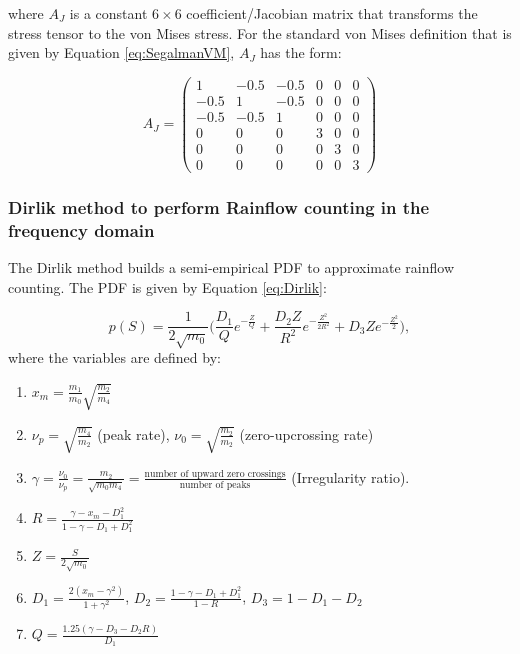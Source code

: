 \documentclass[a4paper,twoside]{bth}
\begin{document}
where $A_J$ is a constant $6 \times 6$ coefficient/Jacobian matrix that transforms the stress tensor to the von Mises stress. For the standard von Mises definition that is given by Equation \ref{eq:SegalmanVM}, $A_J$ has the form:

\begin{equation}
A_J =
\begin{pmatrix}
1 & -0.5 & -0.5 & 0 & 0 & 0 \\
-0.5 & 1 & -0.5 & 0 & 0 & 0 \\
-0.5 & -0.5 & 1 & 0 & 0 & 0 \\
0 & 0 & 0 & 3 & 0 & 0 \\
0 & 0 & 0 & 0 & 3 & 0 \\
0 & 0 & 0 & 0 & 0 & 3
\end{pmatrix}
\end{equation}

\subsubsection{Dirlik method to perform Rainflow counting in the frequency domain}
The Dirlik method builds a semi-empirical \ac{PDF} to approximate rainflow counting. The \ac{PDF} is given by Equation \ref{eq:Dirlik}:

\begin{equation} \label{eq:Dirlik}
    p(S) = \frac{1}{2\sqrt{m_0}} \big( \frac{D_1}{Q}e^{-\frac{Z}{Q}} + \frac{D_2Z}{R^2}e^{-\frac{Z^2}{2R^2}}+D_3Ze^{-\frac{Z^2}{2}} \big),
\end{equation}
where the variables are defined by:
\begin{enumerate} %
    \item $x_m = \frac{m_1}{m_0} \sqrt{\frac{m_2}{m_4}}$
    \item $\nu_p = \sqrt{\frac{m_4}{m_2}}$ (peak rate), $\nu_0 = \sqrt{\tfrac{m_2}{m_2}}$ (zero-upcrossing rate)
    \item $\gamma = \frac{\nu_0}{\nu_p} = \frac{m_2}{\sqrt{m_0m_4}} = \frac{\text{number of upward zero crossings}}{\text{number of peaks}}$ (Irregularity ratio).
    \item $R=\frac{\gamma-x_m-D_1^2}{1-\gamma-D_1+D_1^2}$
    \item $Z = \frac{S}{2\sqrt{m_0}}$
    \item $D_1 = \frac{2(x_m-\gamma^2)}{1+\gamma^2}$, \quad $D_2 = \frac{1-\gamma - D_1+D_1^2}{1-R}$, \quad $D_3 = 1-D_1-D_2$
    \item $Q = \frac{1.25(\gamma-D_3-D_2R)}{D_1}$
\end{enumerate}
\end{document}

